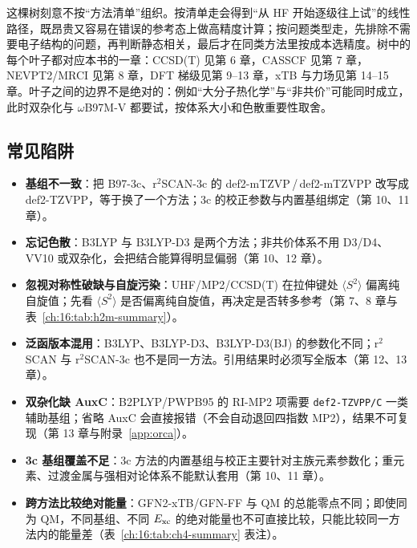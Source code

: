 这棵树刻意不按“方法清单”组织。按清单走会得到“从 HF 开始逐级往上试”的线性路径，既昂贵又容易在错误的参考态上做高精度计算；按问题类型走，先排除不需要电子结构的问题，再判断静态相关，最后才在同类方法里按成本选精度。树中的每个叶子都对应本书的一章：CCSD(T) 见第 6 章，CASSCF 见第 7 章，NEVPT2/MRCI 见第 8 章，DFT 梯级见第 9--13 章，xTB 与力场见第 14--15 章。叶子之间的边界不是绝对的：例如“大分子热化学”与“非共价”可能同时成立，此时双杂化与 $\omega$B97M-V 都要试，按体系大小和色散重要性取舍。

\subsection{常见陷阱}
\label{ch:16:sec:pitfalls}

\begin{pitfall}
\begin{itemize}
  \item \textbf{基组不一致}：把 B97-3c、r$^2$SCAN-3c 的 def2-mTZVP\,/\,def2-mTZVPP 改写成 def2-TZVPP，等于换了一个方法；3c 的校正参数与内置基组绑定（第 10、11 章）。
  \item \textbf{忘记色散}：B3LYP 与 B3LYP-D3 是两个方法；非共价体系不用 D3/D4、VV10 或双杂化，会把结合能算得明显偏弱（第 10、12 章）。
  \item \textbf{忽视对称性破缺与自旋污染}：UHF/MP2/CCSD(T) 在拉伸键处 $\langle S^2\rangle$ 偏离纯自旋值；先看 $\langle S^2\rangle$ 是否偏离纯自旋值，再决定是否转多参考（第 7、8 章与表~\ref{ch:16:tab:h2m-summary}）。
  \item \textbf{泛函版本混用}：B3LYP、B3LYP-D3、B3LYP-D3(BJ) 的参数化不同；r$^2$SCAN 与 r$^2$SCAN-3c 也不是同一方法。引用结果时必须写全版本（第 12、13 章）。
  \item \textbf{双杂化缺 AuxC}：B2PLYP/PWPB95 的 RI-MP2 项需要 \texttt{def2-TZVPP/C} 一类辅助基组；省略 AuxC 会直接报错（不会自动退回四指数 MP2），结果不可复现（第 13 章与附录~\ref{app:orca}）。
  \item \textbf{3c 基组覆盖不足}：3c 方法的内置基组与校正主要针对主族元素参数化；重元素、过渡金属与强相对论体系不能默认套用（第 10、11 章）。
  \item \textbf{跨方法比较绝对能量}：GFN2-xTB/GFN-FF 与 QM 的总能零点不同；即使同为 QM，不同基组、不同 $E_{\mathrm{xc}}$ 的绝对能量也不可直接比较，只能比较同一方法内的能量差（表~\ref{ch:16:tab:ch4-summary} 表注）。
\end{itemize}
\end{pitfall}


